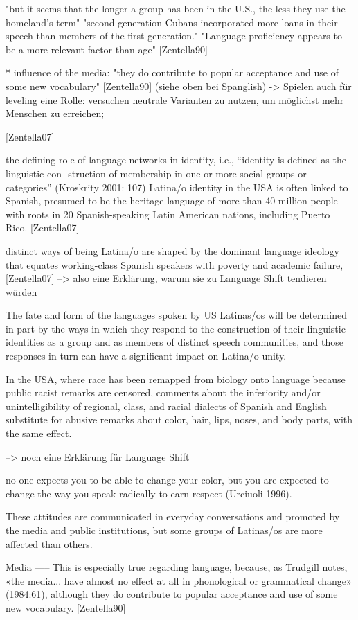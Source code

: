 "but it seems that the longer a group has been in the U.S., the less they use the homeland's term"
"second generation Cubans incorporated more loans in their speech than members of the first generation."
"Language proficiency appears to be a more relevant factor than age" [Zentella90]

* influence of the media: "they do contribute to popular acceptance and use of some new vocabulary" [Zentella90]
(siehe oben bei Spanglish)
-> Spielen auch für leveling eine Rolle: versuchen neutrale Varianten zu nutzen, um möglichst mehr Menschen zu erreichen;

[Zentella07]


the defining role of language networks in identity, i.e., “identity is defined as the linguistic con-
struction of membership in one or more social groups or categories” (Kroskrity 2001: 107)
Latina/o identity in the USA is often linked to Spanish, presumed
to be the heritage language of more than 40 million people with roots in 20
Spanish-speaking Latin American nations, including Puerto Rico.
[Zentella07]

distinct ways of being Latina/o are shaped by the dominant language ideology
that equates working-class Spanish speakers with poverty and academic failure,
[Zentella07]
--> also eine Erklärung, warum sie zu Language Shift tendieren würden

The fate and form of the languages spoken by US
Latinas/os will be determined in part by the ways in which they respond to the
construction of their linguistic identities as a group and as members of distinct
speech communities, and those responses in turn can have a significant impact
on Latina/o unity.


In
the USA, where race has been remapped from biology onto language because
public racist remarks are censored, comments about the inferiority and/or
unintelligibility of regional, class, and racial dialects of Spanish and English
substitute for abusive remarks about color, hair, lips, noses, and body parts, with
the same effect.

--> noch eine Erklärung für Language Shift

no one expects you to be able to change your color, but you are expected to
change the way you speak radically to earn respect (Urciuoli 1996).

These attitudes are communicated in everyday conversations and promoted by
the media and public institutions, but some groups of Latinas/os are more affected
than others.


Media
-----
This is especially true regarding language, because, as Trudgill notes, «the media... have almost no effect at all in
phonological or grammatical change» (1984:61), although they do contribute to popular acceptance and
use of some new vocabulary. [Zentella90]


